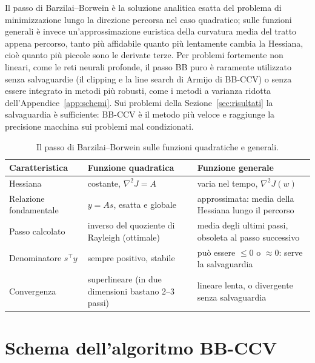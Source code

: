 \documentclass[italian, a4paper, twoside, binding=6mm]{sapthesis}
\begin{document}
Il passo di Barzilai--Borwein è la soluzione analitica
esatta del problema di minimizzazione lungo la direzione percorsa nel caso
quadratico; sulle funzioni generali è invece un'approssimazione euristica
della curvatura media del tratto appena percorso, tanto più affidabile quanto
più lentamente cambia la Hessiana, cioè quanto più piccole sono le derivate
terze. Per problemi fortemente non lineari, come le reti neurali profonde, il
passo BB puro è raramente utilizzato senza salvaguardie (il clipping e la
line search di Armijo di BB-CCV) o senza essere integrato in metodi più
robusti, come i metodi a varianza ridotta dell'Appendice~\ref{app:schemi}.
Sui problemi della Sezione~\ref{sec:risultati} la salvaguardia è sufficiente:
BB-CCV è il metodo più veloce e raggiunge la precisione macchina sui problemi
mal condizionati.

\begin{table}[H]
\centering
\footnotesize
\renewcommand{\arraystretch}{1.35}
\begin{tabular}{@{}>{\raggedright\arraybackslash}p{2.7cm}
                >{\raggedright\arraybackslash}p{5.6cm}
                >{\raggedright\arraybackslash}p{5.6cm}@{}}
\toprule
Caratteristica & Funzione quadratica & Funzione generale \\
\midrule
Hessiana & costante, $\nabla^2 J = A$ & varia nel tempo, $\nabla^2 J(w)$ \\
Relazione fondamentale & $y = A s$, esatta e globale & approssimata: media della Hessiana lungo il percorso \\
Passo calcolato & inverso del quoziente di Rayleigh (ottimale) & media degli ultimi passi, obsoleta al passo successivo \\
Denominatore $s^\top y$ & sempre positivo, stabile & può essere $\le 0$ o $\approx 0$: serve la salvaguardia \\
Convergenza & superlineare (in due dimensioni bastano 2--3 passi) & lineare lenta, o divergente senza salvaguardia \\
\bottomrule
\end{tabular}
\caption{Il passo di Barzilai--Borwein sulle funzioni quadratiche e generali.}
\label{tab:bb_confronto}
\end{table}

\section{Schema dell'algoritmo BB-CCV}\label{app:bbccv-schema}
\end{document}
